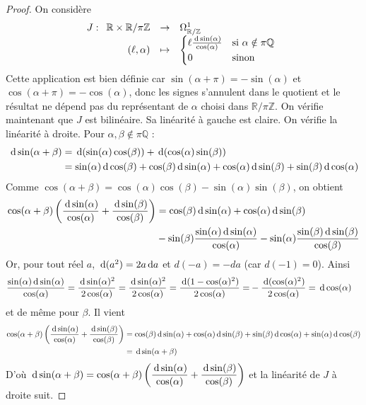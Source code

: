 \documentclass{article}
\newcommand{\Z}{\mathbb{Z}}
\newcommand{\Q}{\mathbb{Q}}
\newcommand{\R}{\mathbb{R}}
\renewcommand{\d}{{\rm \, d}}
\newcommand{\applic}[4]{\begin{array}[t]{rcl}
#1 & \to & #2 \\
#3 & \mapsto & #4
\end{array}}
\theoremstyle{plain}
\theoremstyle{definition}
\theoremstyle{remark}
\begin{document}
\begin{proof}
    On considère
    \[J : \applic{\R \times \R/\pi \Z}{\Omega_{\R/\Z}^1}{(\ell,\alpha)}{\begin{cases} \ell \frac{\d \sin(\alpha)}{\cos(\alpha)} & \text{si $\alpha \notin \pi \Q$} \\ 0 & \text{sinon}\end{cases}}\]
    Cette application est bien définie car $\sin(\alpha + \pi) = - \sin(\alpha)$ et $\cos(\alpha + \pi) = - \cos(\alpha)$, donc les signes s'annulent dans le quotient et le résultat ne dépend pas du représentant de $\alpha$ choisi dans $\R/\pi\Z$. On vérifie maintenant que $J$ est bilinéaire. Sa linéarité à gauche est claire. On vérifie la linéarité à droite. Pour $\alpha,\beta \notin \pi \Q$ :
    \begin{align*}
        \d \sin(\alpha + \beta) & = \d (\sin (\alpha) \cos(\beta)) + \d (\cos(\alpha) \sin (\beta)) \\
        & = \sin(\alpha) \d \cos(\beta) + \cos(\beta) \d \sin (\alpha) + \cos(\alpha) \d \sin(\beta) + \sin(\beta) \d \cos (\alpha)
    \end{align*}
    Comme $\cos(\alpha + \beta) = \cos(\alpha)\cos(\beta) - \sin(\alpha) \sin(\beta)$, on obtient
    \begin{align*}
        \cos(\alpha + \beta) \left(\frac{\d \sin(\alpha)}{\cos(\alpha)} + \frac{\d \sin(\beta)}{\cos(\beta)}\right) & = \cos(\beta) \d \sin(\alpha) + \cos(\alpha) \d \sin(\beta) \\
        & - \sin(\beta) \frac{\sin(\alpha) \d \sin(\alpha)}{\cos(\alpha)} - \sin(\alpha)\frac{\sin(\beta) \d \sin(\beta)}{\cos(\beta)}
    \end{align*}
    Or, pour tout réel $a$, $\d (a^2) = 2 a \d a$ et $d(-a) = -da$ (car $d(-1) = 0$). Ainsi
    \begin{align*}
        \frac{\sin(\alpha) \d \sin(\alpha)}{\cos(\alpha)} = 
        \frac{\d \sin(\alpha)^2}{2\cos(\alpha)} = \frac{\d \sin(\alpha)^2}{2\cos(\alpha)} = \frac{\d(1 -  \cos(\alpha)^2)}{2\cos(\alpha)} = &- \frac{\d(\cos(\alpha)^2)}{2\cos(\alpha)} = \d \cos(\alpha)
    \end{align*}
    et de même pour $\beta$. Il vient
    \begin{align*}
        \cos(\alpha + \beta) \left(\frac{\d \sin(\alpha)}{\cos(\alpha)} + \frac{\d \sin(\beta)}{\cos(\beta)}\right) & = \cos(\beta) \d \sin(\alpha) + \cos(\alpha) \d \sin(\beta) + \sin(\beta) \d \cos(\alpha) + \sin(\alpha) \d \cos(\beta) \\
        & = \d \sin(\alpha + \beta)
    \end{align*}
    D'où $\displaystyle \d \sin(\alpha + \beta) = \cos(\alpha+\beta) \left(\frac{\d \sin(\alpha)}{\cos(\alpha)} + \frac{\d \sin(\beta)}{\cos(\beta)}\right)$ et la linéarité de $J$ à droite suit.
\end{proof}
\end{document}
